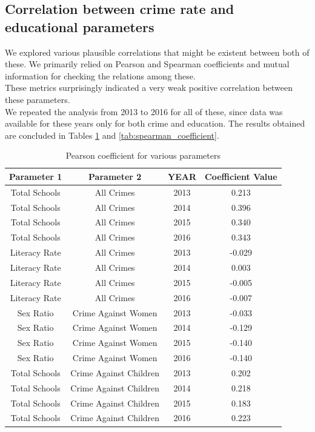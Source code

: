 \documentclass[twoside]{article}
\begin{document}
\subsection*{Correlation between crime rate and educational parameters}
We explored various plausible correlations that might be existent between both of these.
We primarily relied on Pearson and Spearman coefficients and mutual information for checking the relations among these.\\
These metrics surprisingly indicated a very weak positive correlation between these parameters.\\
We repeated the analysis from 2013 to 2016 for all of these, since data was available for these years only for both crime and education.
The results obtained are concluded in Tables \ref{tab:pearson_coefficient} and \ref{tab:spearman_coefficient}.
\begin{table}[h!]
\centering
\begin{tabular}{||c c c c||} 
 \hline
 Parameter 1 & Parameter 2 & YEAR & Coefficient Value \\ [0.5ex] 
 \hline\hline
 Total Schools & All Crimes & 2013 & 0.213 \\ 
 Total Schools & All Crimes & 2014 & 0.396 \\ 
 Total Schools & All Crimes & 2015 & 0.340 \\ 
 Total Schools & All Crimes & 2016 & 0.343 \\ 
 
 Literacy Rate & All Crimes & 2013 & -0.029 \\ 
 Literacy Rate & All Crimes & 2014 & 0.003 \\ 
 Literacy Rate & All Crimes & 2015 & -0.005 \\ 
 Literacy Rate & All Crimes & 2016 & -0.007 \\ 
    
 Sex Ratio & Crime Against Women & 2013 & -0.033 \\ 
 Sex Ratio & Crime Against Women & 2014 & -0.129 \\ 
 Sex Ratio & Crime Against Women & 2015 & -0.140 \\ 
 Sex Ratio & Crime Against Women & 2016 & -0.140 \\ 
 
 Total Schools & Crime Against Children & 2013 & 0.202 \\ 
 Total Schools & Crime Against Children & 2014 & 0.218 \\ 
 Total Schools & Crime Against Children & 2015 & 0.183 \\ 
 Total Schools & Crime Against Children & 2016 & 0.223 \\ [1ex] 
 \hline
\end{tabular}
\caption{Pearson coefficient for various parameters}
\label{tab:pearson_coefficient}
\end{table}
\end{document}
